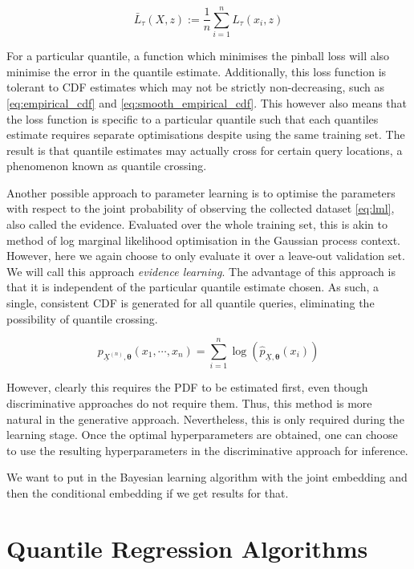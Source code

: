 \documentclass[twoside]{article} \usepackage{aistats2017}
\theoremstyle{definition}
\theoremstyle{remark}
\newcommand{\rv}[1]{\underline{#1}}
\newcommand{\ds}[1]{{#1}}
\newcommand{\warn}[1]{{\color{RedOrange} #1}}
\begin{document}
	\begin{equation}
		\bar{L}_{\tau}(\ds{X}, z) := \frac{1}{n} \sum_{i = 1}^{n} L_{\tau}(x_{i}, z)
	\label{eq:expected_pinball_loss}
	\end{equation}
	
	For a particular quantile, a function which minimises the pinball loss will also minimise the
	error in the quantile estimate. Additionally, this loss function is tolerant to CDF estimates which may not be strictly non-decreasing, such as \eqref{eq:empirical_cdf} and \eqref{eq:smooth_empirical_cdf}. This however also means that the loss function is specific to a particular quantile such that each quantiles estimate requires separate optimisations despite using the same training set. The result is that quantile estimates may actually cross for certain query locations, a phenomenon known as quantile crossing.
	
	Another possible approach to parameter learning is to optimise the parameters with respect to the joint probability of observing the collected dataset \eqref{eq:lml}, also called the evidence. Evaluated over the whole training set, this is akin to method of log marginal likelihood optimisation in the Gaussian process context. However, here we again choose to only evaluate it over a leave-out validation set. We will call this approach \textit{evidence learning}. The advantage of this approach is that it is independent of the particular quantile estimate chosen. As such, a single, consistent CDF is generated for all quantile queries, eliminating the possibility of quantile crossing. 
	
	\begin{equation}
		p_{\rv{X}^{(n)}, \bm{\theta}}(x_{1}, \cdots, x_{n}) = \sum_{i = 1}^{n} \log(\hat{p}_{\rv{X}, \bm{\theta}}(x_{i}))
	\label{eq:lml}
	\end{equation}
	
	However, clearly this requires the PDF to be estimated first, even though discriminative approaches do not require them. Thus, this method is more natural in the generative approach. Nevertheless, this is only required during the learning stage. Once the optimal hyperparameters are obtained, one can choose to use the resulting hyperparameters in the discriminative approach for inference.
	
	\warn{We want to put in the Bayesian learning algorithm with the joint embedding and then the conditional embedding if we get results for that.}
	
\section{Quantile Regression Algorithms}
\label{sec:quantile_regression_algorithms}
\end{document}
